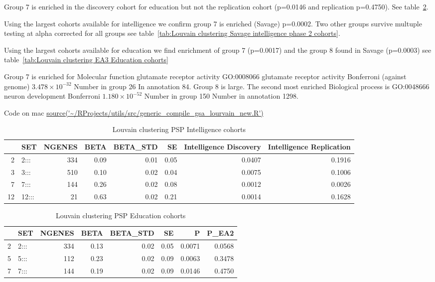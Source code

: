 Group 7 is enriched in the discovery cohort for education but not the replication cohort (p=0.0146 and replication p=0.4750). See table~\ref{tab:Louvain clustering education}.

Using the largest cohorts available for intelligence we confirm group 7 is enriched (Savage) p=0.0002. Two other groups survive multuple testing at alpha corrected for all groups see table~\ref{tab:Louvain clustering Savage intelligence phase 2 cohorts}. 

Using the largest cohorts available for education we find enrichment of group 7 (p=0.0017) and the group 8 found in Savage (p=0.0003) see table~\ref{tab:Louvain clustering EA3 Education cohorts}

Group 7 is enriched for Molecular function glutamate receptor activity GO:0008066 	glutamate receptor activity 		 	Bonferroni (against genome) $3.478 \times 10^{-32}$ 	Number in group 26  In annotation	84. 
Group 8 is large. The second most enriched Biological process is GO:0048666 	neuron development 		Bonferroni	$1.180 \times 10^{-52}$ 	Number in group 150 	Number in annotation 1298.

Code on mac \url{source('~/RProjects/utils/src/generic_compile_gsa_lourvain_new.R')}
\begin{table}[ht]
\centering
\begin{tabular}{rlrrrrrr}
  \hline
 & SET & NGENES & BETA & BETA\_STD & SE & Intelligence Discovery & Intelligence Replication \\ 
  \hline
2 & 2::: & 334 & 0.09 & 0.01 & 0.05 & 0.0407 & 0.1916 \\ 
  3 & 3::: & 510 & 0.10 & 0.02 & 0.04 & 0.0075 & 0.1006 \\ 
  7 & 7::: & 144 & 0.26 & 0.02 & 0.08 & 0.0012 & 0.0026 \\ 
  12 & 12::: & 21 & 0.63 & 0.02 & 0.21 & 0.0014 & 0.1628 \\ 
   \hline
\end{tabular}
\caption{Louvain clustering PSP Intelligence cohorts}
\label{tab:Louvain clustering intelligence}
\end{table}


\begin{table}[ht]
\centering
\begin{tabular}{rlrrrrrr}
  \hline
 & SET & NGENES & BETA & BETA\_STD & SE & P & P\_EA2 \\ 
  \hline
2 & 2::: & 334 & 0.13 & 0.02 & 0.05 & 0.0071 & 0.0568 \\ 
  5 & 5::: & 112 & 0.23 & 0.02 & 0.09 & 0.0063 & 0.3478 \\ 
  7 & 7::: & 144 & 0.19 & 0.02 & 0.09 & 0.0146 & 0.4750 \\ 
   \hline
\end{tabular}
\caption{Louvain clustering PSP Education cohorts}
\label{tab:Louvain clustering education}
\end{table}

